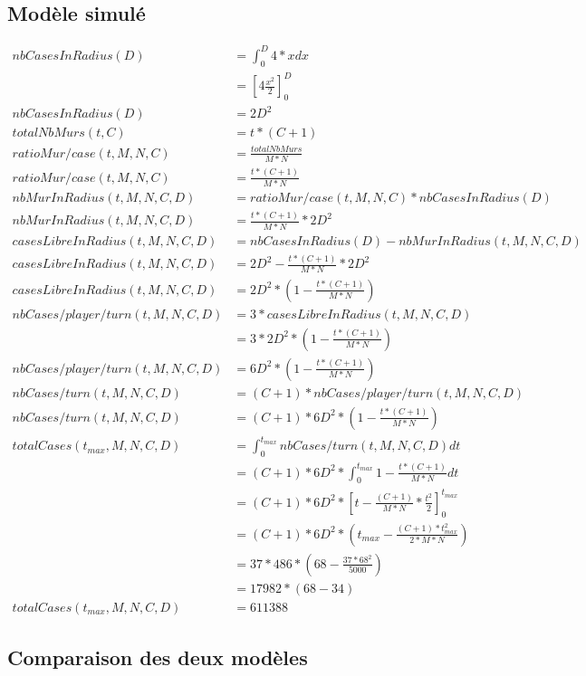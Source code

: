 		\subsection{Modèle simulé}
		
		\begin{align}
			nbCasesInRadius(D) &=\int_{0}^{D} 4*x dx\\
			&= [4\frac{x^2}{2}]_{0}^{D}\\
			nbCasesInRadius(D) &= 2D^2\\
			totalNbMurs(t,C) &= t*(C+1)\\
			ratioMur/case(t, M, N, C)&= \frac{totalNbMurs}{M*N}\\
			ratioMur/case(t, M, N, C)&= \frac{t*(C+1)}{M*N}\\
			nbMurInRadius(t,M,N,C,D)&=ratioMur/case(t, M, N, C)*nbCasesInRadius(D)\\
			nbMurInRadius(t,M,N,C,D)&=\frac{t*(C+1)}{M*N}*2D^2\\
			casesLibreInRadius(t,M,N,C,D)&=nbCasesInRadius(D) - nbMurInRadius(t,M,N,C,D)\\
			casesLibreInRadius(t,M,N,C,D)&=2D^2-\frac{t*(C+1)}{M*N}*2D^2\\
			casesLibreInRadius(t,M,N,C,D)&=2D^2*(1 - \frac{t*(C+1)}{M*N})\\
			nbCases/player/turn(t,M,N,C,D) &= 3*casesLibreInRadius(t,M,N,C,D)\\
			&= 3*2D^2*(1 - \frac{t*(C+1)}{M*N})\\
			nbCases/player/turn(t,M,N,C,D) &= 6D^2*(1 - \frac{t*(C+1)}{M*N})\\
			nbCases/turn(t,M,N,C,D) &= (C+1)*nbCases/player/turn(t,M,N,C,D)\\
			nbCases/turn(t,M,N,C,D) &= (C+1)*6D^2*(1 - \frac{t*(C+1)}{M*N})\\
			totalCases(t_{max},M,N,C,D) &= \int_{0}^{t_{max}} nbCases/turn(t,M,N,C,D) dt\\
			&= (C+1)*6D^2* \int_{0}^{t_{max}} 1 - \frac{t*(C+1)}{M*N} dt\\
			&= (C+1) * 6D^2 * [ t - \frac{(C+1)}{M*N} * \frac{t^2}{2} ]_{0}^{t_{max}}\\
			&= (C+1) * 6D^2 * (t_{max} - \frac{(C+1)*t_{max}^2}{2*M*N})\\
			&= 37 * 486 *(68 - \frac{37*68^2}{5000})\\
			&= 17982 * (68 - 34)\\
			totalCases(t_{max},M,N,C,D) &= 611388
		\end{align}
		
		\subsection{Comparaison des deux modèles}
		
